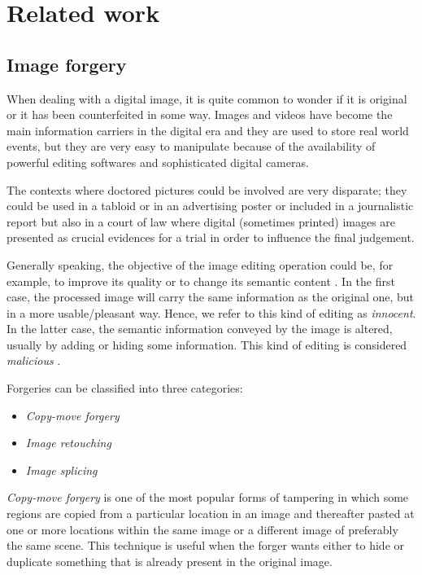 \chapter{Related work}

\section{Image forgery}

When dealing with a digital image, it is quite common to wonder if it is original or it has been counterfeited in some way. Images and videos have become the main information carriers in the digital era and they are used to store real world events, but they are very easy to manipulate because of the availability of powerful editing softwares and sophisticated digital cameras.

The contexts where doctored pictures could be involved are very disparate; they could be used in a tabloid or in an advertising poster or included in a journalistic report but also in a court of law where digital (sometimes printed) images are presented as crucial evidences for a trial in order to influence the final judgement. 

Generally speaking, the objective of the image editing operation could be, for example, to improve its quality or to change its semantic content \cite{piva2013overview}. In the first case, the processed image will carry the same information as the original one, but in a more usable/pleasant way. Hence, we refer to this kind of editing as \emph{innocent}. In the latter case, the semantic information conveyed by the image is altered, usually by adding or hiding some information. This kind of editing is considered \emph{malicious} \cite{piva2013overview}.

Forgeries can be classified into three categories:

\begin{itemize}
\item \emph{Copy-move forgery}
\item \emph{Image retouching}
\item \emph{Image splicing}
\end{itemize}

\emph{Copy-move forgery} is one of the most popular forms of tampering in which some regions are copied from a particular location in an image and thereafter pasted at one or more locations within the same image or a different image of preferably the same scene. This technique is useful when the forger wants either to hide or duplicate something that is already present in the original image.

